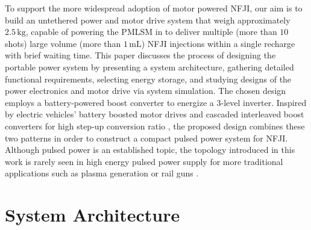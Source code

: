     To support the more widespread adoption of motor powered NFJI, our aim is to build an untethered power and motor drive system that weigh approximately $2.5\,\mathrm{kg}$, capable of powering the PMLSM in \cite{Do2017} to deliver multiple (more than $10$ shots) large volume (more than $1\,\mathrm{mL}$) NFJI injections within a single recharge with brief waiting time. This paper discusses the process of designing the portable power system by presenting a system architecture, gathering detailed functional requirements, selecting energy storage, and studying designs of the power electronics and motor drive via system simulation. The chosen design employs a battery-powered boost converter to energize a 3-level inverter. Inspired by electric vehicles’ battery boosted motor drives \cite{Jin2016} and cascaded interleaved boost converters for high step-up conversion ratio \cite{Sosa2013}, the proposed design combines these two patterns in order to construct a compact pulsed power system for NFJI. Although pulsed power is an established topic, the topology introduced in this work is rarely seen in high energy pulsed power supply for more traditional applications such as plasma generation \cite{Diez2015,Yu2012} or rail guns \cite{McNab2015}.


\section{System Architecture}


